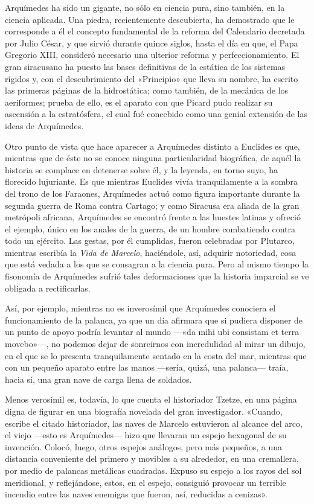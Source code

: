 \documentclass[a4paper, 12pt, draft]{article}
\begin{document}
{%

Arquímedes ha sido un gigante, no sólo en ciencia pura, sino también, en la ciencia aplicada. Una piedra, recientemente descubierta, ha demostrado que le corresponde a él el concepto fundamental de la reforma del Calendario decretada por Julio César, y que sirvió durante quince siglos, hasta el día en que, el Papa Gregorio XIII, consideró necesario una ulterior reforma y perfeccionamiento. El gran siracusano ha puesto las bases definitivas de la estática de los sistemas rígidos y, con el descubrimiento del «Principio» que lleva su nombre,
ha escrito las primeras páginas de la hidrostática; como también, de la mecánica de los aeriformes; prueba de ello, es el aparato con que Picard pudo realizar su ascensión a la estratósfera, el cual fué concebido como una genial extensión de las ideas de Arquímedes.

Otro punto de vista que hace aparecer a Arquímedes distinto a Euclides es que, mientras que de éste no se conoce ninguna particularidad biográfica, de aquél la historia se complace en detenerse sobre él, y la leyenda, en torno suyo, ha florecido lujuriante. Es que mientras Euclides vivía tranquilamente a la sombra del trono de los Faraones, Arquímedes actuó como figura importante durante la segunda guerra de Roma contra Cartago; y como Siracusa era aliada de la gran metrópoli africana, Arquímedes se encontró frente a las huestes latinas y ofreció el ejemplo, único en los anales de la guerra, de un hombre combatiendo contra todo un ejército. Las gestas, por él cumplidas, fueron celebradas por Plutarco, mientras escribía la \textit{ Vida de Marcelo}, haciéndole, así, adquirir notoriedad, cosa que está vedada a los que se consagran a la ciencia pura. Pero al mismo tiempo la fisonomía de Arquímedes sufrió tales deformaciones que la historia imparcial se ve obligada a rectificarlas.

Así, por ejemplo, mientras no es inverosímil que Arquímedes conociera el funcionamiento de la palanca, ya que un día afirmara que si pudiera disponer de un punto de apoyo podría levantar al
mundo ---«da mihi ubi consistam et terra movebo»---, no podemos dejar de sonreirnos con incredulidad al mirar un dibujo, en el que se lo presenta tranquilamente sentado en la costa del mar, mientras que con un pequeño aparato entre las manos ---sería, quizá, una palanca--- traía, hacia sí, una gran nave de carga llena de soldados.

Menos verosímil es, todavía, lo que cuenta el historiador Tzetze, en una página digna de figurar en una biografía novelada del gran investigador. «Cuan\-do, escribe el citado historiador, las naves de Marcelo estuvieron al alcance del arco, el viejo ---esto es Arquímedes--- hizo que llevaran un espejo hexagonal de su invención. Colocó, luego, otros espejos análogos, pero más pequeños, a una distancia conveniente del primero y movibles a su alrededor, en una cremallera, por medio de palancas metálicas cuadradas. Expuso su espejo a los rayos del sol meridional, y reflejándose, estos, en el espejo, consiguió provocar un terrible incendio entre las naves enemigas que fueron, así, reducidas a cenizas».

}
\end{document}
